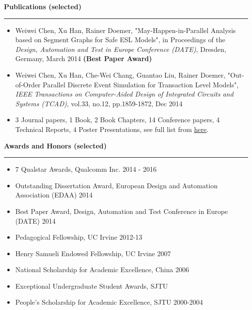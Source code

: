 \documentclass[10pt,A4]{article}
\newcommand{\cvsection}[1]
{
	\begin{flushleft}
  \LARGE\textcolor{sectcol}{\textbf{  #1}}
	\end{flushleft}
  \vspace{-15pt}
  \textcolor{softcol}{\hrule}
  \vspace{8pt}
}
\begin{document}
\cvsection{Publications (selected)}
\vspace{-10pt}
\begin{itemize}
 \setlength\itemsep{-0.1cm}
\item Weiwei Chen, Xu Han, Rainer Doemer, \textcolor{bgcol}{"May-Happen-in-Parallel Analysis based on Segment Graphs for Safe ESL Models"},
  in Proceedings of the \emph{Design, Automation and Test in Europe Conference (DATE)}, Dresden, Germany, March 2014 \textbf{(Best Paper Award)}
 \item Weiwei Chen, Xu Han, Che-Wei Chang, Guantao Liu, Rainer Doemer, \textcolor{bgcol}{"Out-of-Order Parallel Discrete Event Simulation for Transaction Level Models"},
  \emph{IEEE Transactions on Computer-Aided Design of Integrated Circuits and Systems (TCAD)}, vol.33, no.12, pp.1859-1872, Dec 2014
 \item 3 Journal papers, 1 Book, 2 Book Chapters, 14 Conference papers, 4 Technical Reports, 4 Poster Presentations,
  see full list from \href{http://www.cecs.uci.edu/~weiweic/pubs\_by\_type.html}{here}.
\end{itemize}

\cvsection{Awards and Honors (selected)}
\vspace{-10pt}
\begin{itemize}
 \setlength\itemsep{-0.1cm}
 \item 7 Qualstar Awards, Qualcomm Inc. 2014 - 2016
 \item Outstanding Dissertation Award, European Design and Automation Association (EDAA) 2014
 \item Best Paper Award, Design, Automation and Test Conference in Europe (DATE) 2014
 \item Pedagogical Fellowship, UC Irvine 2012-13
 \item Henry Samueli Endowed Fellowship, UC Irvine 2007
 \item National Scholarship for Academic Excellence, China 2006
 \item Exceptional Undergraduate Student Awards, SJTU
 \item People's Scholarship for Academic Excellence, SJTU 2000-2004
\end{itemize}
\end{document}
